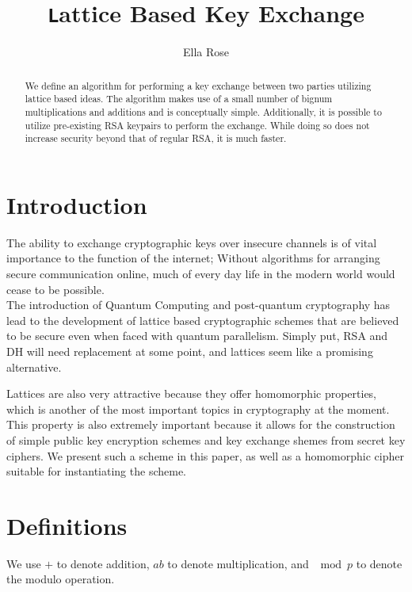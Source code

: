 \documentclass[preprint]{iacrtrans}
\author{Ella Rose\inst{1}}
\institute{Paso Robles, CA \email{python_pride@protonmail.com}}
\title[\texttt Lattice Based Key Exchange]{\texttt Lattice Based Key Exchange}
\begin{document}
\maketitle


\begin{abstract}
  We define an algorithm for performing a key exchange between two parties utilizing lattice based ideas. The algorithm makes use of a small number of bignum multiplications and additions and is conceptually simple. Additionally, it is possible to utilize pre-existing RSA keypairs to perform the exchange. While doing so does not increase security beyond that of regular RSA, it is much faster.\\ 
\end{abstract}

\todototoc
\listoftodos

\section{Introduction}
 The ability to exchange cryptographic keys over insecure channels is of vital importance to the function of the internet; Without algorithms for arranging secure communication online, much of every day life in the modern world would cease to be possible.\\

The introduction of Quantum Computing and post-quantum cryptography has lead to the development of lattice based cryptographic schemes that are believed to be secure even when faced with quantum parallelism. Simply put, RSA and DH will need replacement at some point, and lattices seem like a promising alternative.

Lattices are also very attractive because they offer homomorphic properties, which is another of the most important topics in cryptography at the moment. This property is also extremely important because it allows for the construction of simple public key encryption schemes and key exchange shemes from secret key ciphers. We present such a scheme in this paper, as well as a homomorphic cipher suitable for instantiating the scheme.

\section{Definitions}
We use $+$ to denote addition, $ab$ to denote multiplication, and $\mod p$ to denote the modulo operation.
\end{document}
